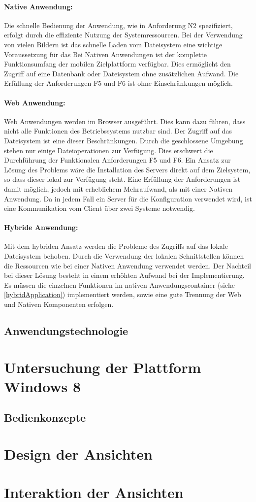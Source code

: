 \paragraph{Native Anwendung: }  Die schnelle Bedienung der Anwendung, wie in Anforderung N2 spezifiziert, erfolgt durch die effiziente Nutzung der Systemressourcen. Bei der Verwendung von vielen Bildern ist das schnelle Laden vom Dateisystem eine wichtige Voraussetzung für das 
Bei Nativen Anwendungen ist der komplette Funktionsumfang der mobilen Zielplattform verfügbar.  Dies ermöglicht den Zugriff auf eine Datenbank oder Dateisystem ohne zusätzlichen Aufwand. Die Erfüllung der Anforderungen F5 und F6 ist ohne Einschränkungen möglich.  

\paragraph{Web Anwendung: } Web Anwendungen werden im Browser ausgeführt. 
 Dies kann dazu führen, dass nicht alle Funktionen des Betriebssystems nutzbar sind. Der Zugriff auf das Dateisystem ist eine dieser Beschränkungen. Durch die geschlossene Umgebung stehen nur einige Dateioperationen zur Verfügung. Dies erschwert die Durchführung der Funktionalen Anforderungen F5 und F6. 
 Ein Ansatz zur Lösung des Problems wäre die Installation des Servers direkt auf dem Zielsystem, so dass dieser lokal zur Verfügung steht. Eine Erfüllung der Anforderungen ist damit möglich, jedoch mit erheblichem Mehraufwand, als mit einer Nativen Anwendung. Da in jedem Fall ein Server für die Konfiguration verwendet wird, ist eine Kommunikation vom Client über zwei Systeme notwendig.

\paragraph{Hybride Anwendung: }Mit dem hybriden Ansatz werden die Probleme des Zugriffs auf das lokale Dateisystem behoben. Durch die Verwendung der lokalen Schnittstellen können die Ressourcen wie bei einer Nativen Anwendung verwendet werden. Der Nachteil bei dieser Lösung besteht in einem erhöhten Aufwand bei der Implementierung. Es müssen die einzelnen Funktionen im nativen Anwendungscontainer (siehe \ref{hybridApplication}) implementiert werden, sowie eine gute Trennung der Web und Nativen Komponenten erfolgen.


\subsection{Anwendungstechnologie}
      
        




\section{Untersuchung der Plattform Windows 8}
\subsection{Bedienkonzepte}



\section{Design der Ansichten}

\section{Interaktion der Ansichten}